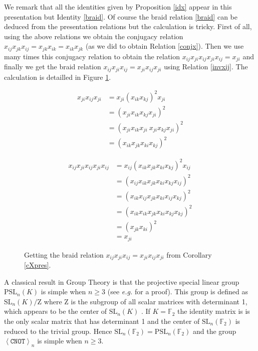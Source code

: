 \documentclass[a4paper,12pt,fleqn]{article}
\newcommand\cnot{\mathtt{CNOT}}
\newcommand\F{\mathbb{F}}
\newcommand\XG[1][n]{\left<\cnot\right>_{#1}}
\newcommand\SL[1][n]{\mathrm{SL}_{#1}(\mathbb{F}_2)}
\renewcommand\geq{\geqslant}
\begin{document}
We remark that all the identities given by Proposition \ref{idx} appear in this presentation but Identity \eqref{braid}. Of course the braid relation \eqref{braid} can be deduced from
the presentation relations but the calculation is tricky. First of all, using the above relations we obtain  the conjugacy relation 
$x_{ij}x_{jk}x_{ij}=x_{jk}x_{ik}=x_{ik}x_{jk}$ (as we did to obtain Relation \eqref{conjx}). Then we use many times this  conjugacy  relation to obtain the relation
$x_{ij}x_{ji}x_{ij}x_{ji}x_{ij}=x_{ji}$ and finally we get the braid relation $x_{ij}x_{ji}x_{ij}=x_{ji}x_{ij}x_{ji}$ using Relation \eqref{invxij}. The calculation is detailled in Figure \ref{tricky}.
 
\begin{figure}[h]
\begin{minipage}[t]{.4\linewidth}
 \begin{equation*}
  \begin{split}
    x_{ji}x_{ij}x_{ji}& = x_{ji}(x_{ik}x_{kj})^2x_{ji}\\
    & =(x_{ji}x_{ik}x_{kj}x_{ji})^2\\
    & = (x_{ji}x_{ik}x_{ji}\ x_{ji}x_{kj}x_{ji})^2\\
    & = (x_{ik}x_{jk}x_{ki}x_{kj})^2
  \end{split}
\end{equation*}
\end{minipage}
\begin{minipage}[t]{.6\linewidth}
\begin{equation*}
  \begin{split}
    x_{ij}x_{ji}x_{ij}x_{ji}x_{ij}&=x_{ij}(x_{ik}x_{jk}x_{ki}x_{kj})^2x_{ij}\\
    &=(x_{ij}x_{ik}x_{jk}x_{ki}x_{kj}x_{ij})^2\\
    &=(x_{ik}x_{ij}x_{jk}x_{ki}x_{ij}x_{kj})^2\\
    &=(x_{ik}x_{ik}x_{jk}x_{ki}x_{kj}x_{kj})^2\\
    &=(x_{jk}x_{ki})^2\\
    &=x_{ji}
  \end{split}
\end{equation*}
\end{minipage}
{ \caption{ Getting the braid relation $x_{ij}x_{ji}x_{ij}=x_{ji}x_{ij}x_{ji}$ from Corollary \ref{cXpres}.\label{tricky}}}
\end{figure}
\medskip

A classical result in Group Theory is that the projective special linear group $\mathrm{PSL}_n(K)$ is simple when $n\geq  3$ (see \textit{e.g.} \cite[Chapter 3]{Wilson2009} for a proof). This group  is defined as $\mathrm{SL}_n(K)/\mathrm{Z}$ where $\mathrm{Z}$ is the subgroup of all scalar matrices with determinant 1,
which appears to be the center of $\mathrm{SL}_n(K)$ . If $K=\F_2$ the identity matrix is is the only scalar matrix that has determinant 1 and the center of $\SL$ is reduced to the trivial group. Hence $\SL=\mathrm{PSL}_n(\F_2)$ and the group $\XG$ is simple when $n\geq  3$.
\end{document}
